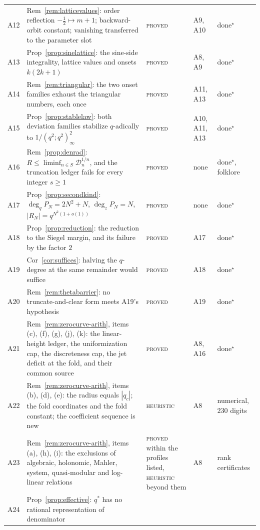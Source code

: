\documentclass[11pt]{article}
\theoremstyle{plain}
\theoremstyle{definition}
\theoremstyle{remark}
\begin{document}
\begin{center}
\begin{tabular}{@{}l>{\raggedright\arraybackslash}p{5.4cm}>{\raggedright\arraybackslash}p{2.4cm}>{\raggedright\arraybackslash}p{1.7cm}>{\raggedright\arraybackslash}p{2.2cm}@{}}
A12 & Rem~\ref{rem:latticevalues}: order reflection $-\tfrac12\mapsto m+1$; backward-orbit
  constant; vanishing transferred to the parameter slot & \textsc{proved} & A9, A10 &
  done$^\star$\\
A13 & Prop~\ref{prop:sinelattice}: the sine-side integrality, lattice values and onsets
  $k(2k+1)$ & \textsc{proved} & A8, A9 & done$^\star$\\
A14 & Rem~\ref{rem:triangular}: the two onset families exhaust the triangular numbers, each once
  & \textsc{proved} & A11, A13 & done$^\star$\\
A15 & Prop~\ref{prop:stablelaw}: both deviation families stabilize $q$-adically to
  $1/(q^2;q^2)_\infty^2$ & \textsc{proved} & A10, A11, A13 & done$^\star$\\
A16 & Rem~\ref{prop:denrad}: $R\le\liminf_{n\in S}\mathcal D_n^{1/n}$, and the truncation ledger
  fails for every integer $s\ge1$ & \textsc{proved} & none & done$^\star$, folklore\\
A17 & Prop~\ref{prop:secondkind}: $\deg_qP_N=2N^2+N$, $\deg_zP_N=N$,
  $|R_N|=q^{N^2(1+o(1))}$ & \textsc{proved} & none & done$^\star$\\
A18 & Prop~\ref{prop:reduction}: the reduction to the Siegel margin, and its failure by the
  factor $2$ & \textsc{proved} & A17 & done$^\star$\\
A19 & Cor~\ref{cor:suffices}: halving the $q$-degree at the same remainder would suffice &
  \textsc{proved} & A18 & done$^\star$\\
A20 & Rem~\ref{rem:thetabarrier}: no truncate-and-clear form meets A19's hypothesis &
  \textsc{proved} & A19 & done$^\star$\\
A21 & Rem~\ref{rem:zerocurve-arith}, items (c), (f), (g), (j), (k): the linear-height ledger, the
  uniformization cap, the discreteness cap, the jet deficit at the fold, and their common source
  & \textsc{proved} & A8, A16 & done$^\star$\\
A22 & Rem~\ref{rem:zerocurve-arith}, items (b), (d), (e): the radius equals $|q_c|$; the fold
  coordinates and the fold constant; the coefficient sequence is new &
  \textsc{heuristic} & A8 & numerical, $230$ digits\\
A23 & Rem~\ref{rem:zerocurve-arith}, items (a), (h), (i): the exclusions of algebraic, holonomic,
  Mahler, system, quasi-modular and log-linear relations &
  \textsc{proved} within the profiles listed, \textsc{heuristic} beyond them & A8 &
  rank certificates\\
A24 & Prop~\ref{prop:effective}: $q^\ast$ has no rational representation of denominator

\end{tabular}
\end{center}
\end{document}
